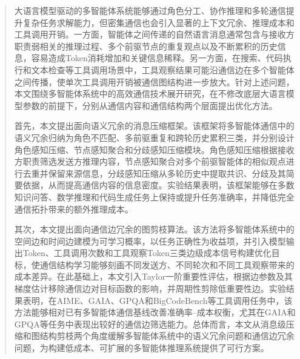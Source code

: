 
\begin{abstract}
  大语言模型驱动的多智能体系统能够通过角色分工、协作推理和多轮通信提升复杂任务求解能力，但密集通信也会引入显著的上下文冗余、推理成本和工具调用开销。一方面，智能体之间传递的自然语言消息通常包含与接收方职责弱相关的推理过程、多个前驱节点的重复观点以及不断累积的历史信息，容易造成Token消耗增加和关键信息稀释。另一方面，在搜索、代码执行和文本检查等工具调用场景中，工具观察结果可能沿通信边在多个智能体之间传播，使单次工具调用开销被通信图结构进一步放大。针对上述问题，本文围绕多智能体系统中的高效通信技术展开研究，在不修改底层大语言模型参数的前提下，分别从通信内容和通信结构两个层面提出优化方法。

  首先，本文提出面向语义冗余的消息压缩框架。该框架将多智能体通信中的语义冗余归纳为角色不匹配、多前驱重复和跨轮历史累积三类，并分别设计角色感知压缩、节点感知聚合和分歧感知压缩模块。角色感知压缩根据接收方职责筛选发送方推理内容，节点感知聚合对多个前驱智能体的相似观点进行去重并保留来源信息，分歧感知压缩从多轮历史中提取共识、分歧及其简要依据，从而提高通信内容的信息密度。实验结果表明，该框架能够在多数知识问答、数学推理和代码生成任务上保持或提升任务准确率，并降低完全通信拓扑带来的额外推理成本。

  其次，本文提出面向通信边冗余的图剪枝算法。该方法将多智能体系统中的空间边和时间边建模为可学习概率，以任务正确性为收益项，并引入模型输出Token、工具调用次数和工具观察Token三类边级成本信号构建优化目标，使通信结构学习能够刻画不同发送方、不同轮次和不同工具观察带来的成本差异。在此基础上，本文引入Taylor一阶重要性评估，根据边参数及其梯度估计移除通信边对目标函数的影响，并周期性剪除低重要性边。实验结果表明，在AIME、GAIA、GPQA和BigCodeBench等工具调用任务中，该方法能够相对已有多智能体通信基线改善准确率--成本权衡，尤其在GAIA和GPQA等任务中表现出较好的通信边筛选能力。总体而言，本文从消息级压缩和图结构剪枝两个角度缓解多智能体系统中的语义冗余问题和通信边冗余问题，为构建低成本、可扩展的多智能体推理系统提供了可行方案。
\end{abstract}


